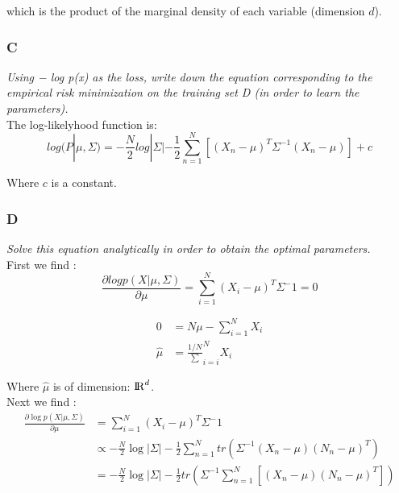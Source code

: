 \documentclass{amsart}
\theoremstyle{definition}
\theoremstyle{remark}
\numberwithin{equation}{section}
\begin{document}
which is the product of the marginal density of each variable (dimension $d$).

\subsubsection{C}

\textit{Using − log p(x) as the loss, write down the equation corresponding 
        to the empirical risk minimization on the training set D (in order to 
        learn the parameters).} \\

The log-likelyhood function is: \\

\begin{equation}
    log(P|\mu,\Sigma) = -\frac{N}{2}log|\Sigma| -\frac{1}{2} 
        \sum_{n=1}^{N} [(X_n - \mu)^T \Sigma^{-1} (X_n - \mu)] + c
\end{equation}

Where $c$ is a constant. \\

\subsubsection{D}

\textit{Solve this equation analytically in order to obtain the optimal
            parameters.} \\

First we find \hat{\mu}: \\

\begin{equation}
    \frac{\partial log p(X | \mu, \Sigma)}{\partial\mu} = 
        \sum_{i=1}^{N}(X_i-\mu)^T \Sigma^-1 = 0 
\end{equation}


\begin{equation}
    \begin{align}
    0 &= N \mu - \sum_{i=1}^{N}X_i \\
    \hat\mu & = \frac{1/N}\sum_{i=i}^{N}X_i
    \end{align}
\end{equation}

Where $\hat\mu$ is of dimension: ${\rm I\!R}^d$. \\

Next we find \hat{\Sigma}: \\

\begin{equation}
    \begin{align}
    \frac{\partial \log p(X | \mu, \Sigma)}{\partial\mu} & = \sum_{i=1}^{N}(X_i-\mu)^T \Sigma^-1 \\
    & \propto -\frac{N}{2} \log|\Sigma| -\frac{1}{2} \sum_{n=1}^{N} tr(\Sigma^{-1}(X_n-\mu)(N_n-\mu)^T) \\
    & = -\frac{N}{2} \log|\Sigma| -\frac{1}{2}tr(\Sigma^{-1} \sum_{n=1}^{N} [(X_n-\mu)(N_n-\mu)^T])
    \end{align}
\end{equation}
\end{document}
